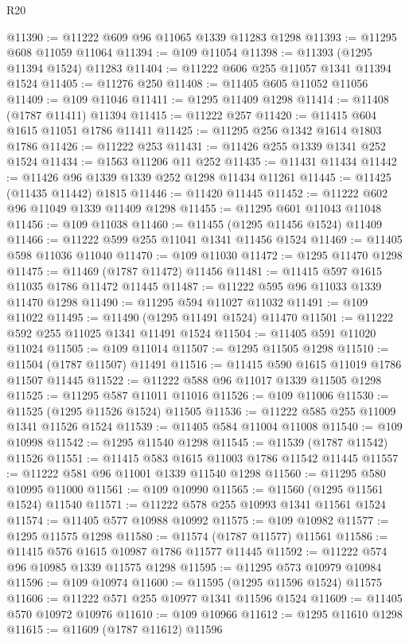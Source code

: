 \begin{lexlean}{R20}
\begin{coremodule}
@11390 := @11222 @609 @96 @11065 @1339 @11283 @1298
@11393 := @11295 @608 @11059 @11064
@11394 := @109 @11054
@11398 := @11393 (@1295 @11394 @1524) @11283
@11404 := @11222 @606 @255 @11057 @1341 @11394 @1524
@11405 := @11276 @250
@11408 := @11405 @605 @11052 @11056
@11409 := @109 @11046
@11411 := @1295 @11409 @1298
@11414 := @11408 (@1787 @11411) @11394
@11415 := @11222 @257
@11420 := @11415 @604 @1615 @11051 @1786 @11411
@11425 := @11295 @256 @1342 @1614 @1803 @1786
@11426 := @11222 @253
@11431 := @11426 @255 @1339 @1341 @252 @1524
@11434 := @1563 @11206 @11 @252
@11435 := @11431 @11434
@11442 := @11426 @96 @1339 @1339 @252 @1298 @11434 @11261
@11445 := @11425 (@11435 @11442) @1815
@11446 := @11420 @11445
@11452 := @11222 @602 @96 @11049 @1339 @11409 @1298
@11455 := @11295 @601 @11043 @11048
@11456 := @109 @11038
@11460 := @11455 (@1295 @11456 @1524) @11409
@11466 := @11222 @599 @255 @11041 @1341 @11456 @1524
@11469 := @11405 @598 @11036 @11040
@11470 := @109 @11030
@11472 := @1295 @11470 @1298
@11475 := @11469 (@1787 @11472) @11456
@11481 := @11415 @597 @1615 @11035 @1786 @11472 @11445
@11487 := @11222 @595 @96 @11033 @1339 @11470 @1298
@11490 := @11295 @594 @11027 @11032
@11491 := @109 @11022
@11495 := @11490 (@1295 @11491 @1524) @11470
@11501 := @11222 @592 @255 @11025 @1341 @11491 @1524
@11504 := @11405 @591 @11020 @11024
@11505 := @109 @11014
@11507 := @1295 @11505 @1298
@11510 := @11504 (@1787 @11507) @11491
@11516 := @11415 @590 @1615 @11019 @1786 @11507 @11445
@11522 := @11222 @588 @96 @11017 @1339 @11505 @1298
@11525 := @11295 @587 @11011 @11016
@11526 := @109 @11006
@11530 := @11525 (@1295 @11526 @1524) @11505
@11536 := @11222 @585 @255 @11009 @1341 @11526 @1524
@11539 := @11405 @584 @11004 @11008
@11540 := @109 @10998
@11542 := @1295 @11540 @1298
@11545 := @11539 (@1787 @11542) @11526
@11551 := @11415 @583 @1615 @11003 @1786 @11542 @11445
@11557 := @11222 @581 @96 @11001 @1339 @11540 @1298
@11560 := @11295 @580 @10995 @11000
@11561 := @109 @10990
@11565 := @11560 (@1295 @11561 @1524) @11540
@11571 := @11222 @578 @255 @10993 @1341 @11561 @1524
@11574 := @11405 @577 @10988 @10992
@11575 := @109 @10982
@11577 := @1295 @11575 @1298
@11580 := @11574 (@1787 @11577) @11561
@11586 := @11415 @576 @1615 @10987 @1786 @11577 @11445
@11592 := @11222 @574 @96 @10985 @1339 @11575 @1298
@11595 := @11295 @573 @10979 @10984
@11596 := @109 @10974
@11600 := @11595 (@1295 @11596 @1524) @11575
@11606 := @11222 @571 @255 @10977 @1341 @11596 @1524
@11609 := @11405 @570 @10972 @10976
@11610 := @109 @10966
@11612 := @1295 @11610 @1298
@11615 := @11609 (@1787 @11612) @11596

\end{coremodule}
\end{lexlean}
